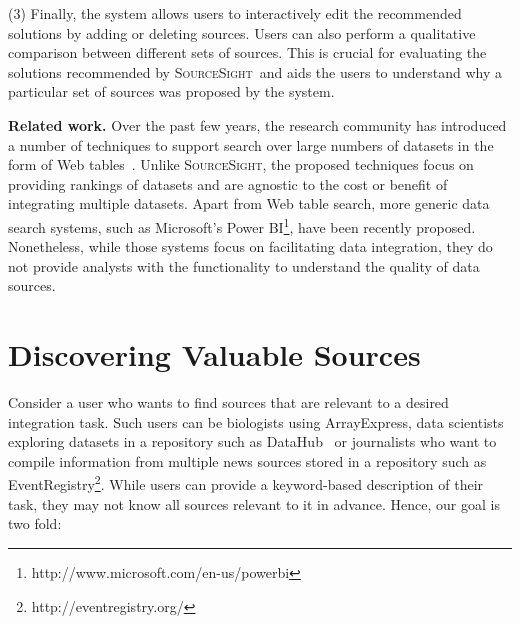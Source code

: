 \documentclass{vldb}
\newcommand\system{\textsc{SourceSight}}
\begin{document}
\vspace{2pt}\noindent (3) Finally, the system allows users to interactively edit the recommended solutions by adding or deleting sources. Users can also perform a qualitative comparison between different sets of sources. This is crucial for evaluating the solutions recommended by \system~and aids the users to understand why a particular set of sources was proposed by the system.

\noindent\textbf{Related work.} Over the past few years, the research community has introduced a number of techniques to support search over large numbers of datasets in the form of Web tables~\cite{limaye:2010,dassarma:2012,yakout:2012}. Unlike \system, the proposed techniques focus on providing rankings of datasets and are agnostic to the cost or benefit of integrating multiple datasets. Apart from Web table search, more generic data search systems, such as Microsoft's Power BI\footnote{http://www.microsoft.com/en-us/powerbi}, have been recently proposed. Nonetheless, while those systems focus on facilitating data integration, they do not provide analysts with the functionality to understand the quality of data sources.


\section{Discovering Valuable Sources}
\label{sec:sources}
Consider a user who wants to find sources that are relevant to a desired integration task. Such users can be biologists using ArrayExpress, data scientists exploring datasets in a repository such as DataHub~\cite{datahub} or journalists who want to compile information from multiple news sources stored in a repository such as EventRegistry\footnote{http://eventregistry.org/}. While users can provide a keyword-based description of their task, they may not know all sources relevant to it in advance. Hence, our goal is two fold: 
\end{document}
